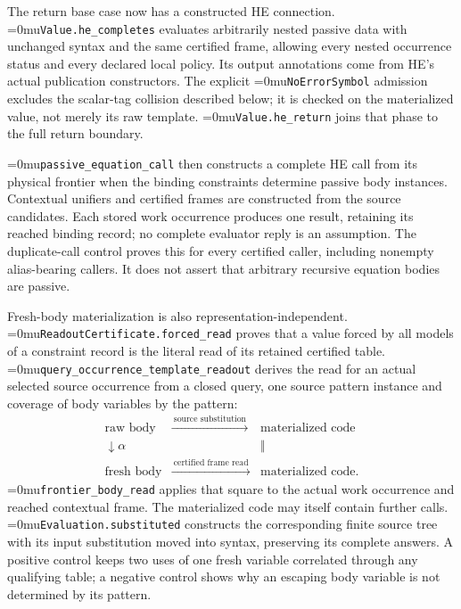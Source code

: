 \documentclass[11pt,a4paper]{article}
\newcommand{\name}[1]{\textup{\Urlmuskip=0mu\relax\nolinkurl{#1}}}
\begin{document}
The return base case now has a constructed HE connection.
\name{Value.he\_completes} evaluates arbitrarily nested passive data with
unchanged syntax and the same certified frame, allowing every nested
occurrence status and every declared local policy. Its output annotations
come from HE's actual publication constructors. The explicit
\name{NoErrorSymbol} admission excludes the scalar-tag collision described
below; it is checked on the materialized value, not merely its raw template.
\name{Value.he\_return} joins that phase to the full return boundary.

\name{passive\_equation\_call} then constructs a complete HE call from its
physical frontier when the binding constraints determine passive body
instances. Contextual unifiers and certified frames are constructed from the
source candidates. Each stored work occurrence produces one result, retaining
its reached binding record; no complete evaluator reply is an assumption.
The duplicate-call control proves this for every certified caller, including
nonempty alias-bearing callers. It does not assert that arbitrary recursive
equation bodies are passive.

Fresh-body materialization is also representation-independent.
\name{ReadoutCertificate.forced\_read} proves that a value forced by all models
of a constraint record is the literal read of its retained certified table.
\name{query\_occurrence\_template\_readout} derives the read for an actual
selected source occurrence from a closed query, one source pattern instance
and coverage of body variables by the pattern:
\[
\begin{array}{ccc}
 \text{raw body}&\xrightarrow{\ \text{source substitution}\ }&\text{materialized code}\\
 \downarrow\scriptstyle\alpha&&\Vert\\
 \text{fresh body}&\xrightarrow{\ \text{certified frame read}\ }&\text{materialized code}.
\end{array}
\]
\name{frontier\_body\_read} applies that square to the actual work occurrence
and reached contextual frame. The materialized code may itself contain further
calls. \name{Evaluation.substituted} constructs the corresponding finite
source tree with its input substitution moved into syntax, preserving its
complete answers. A positive control keeps two uses of one fresh variable
correlated through any qualifying table; a negative control shows why an
escaping body variable is not determined by its pattern.
\end{document}
